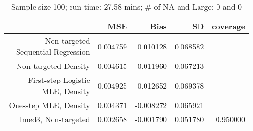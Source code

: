 \begin{table}[ht]
\centering
\caption{Sample size 100; run time: 27.58 mins; # of NA and Large:  0 and 0} 
\begin{tabular}{rrrrr}
  \hline
 & MSE & Bias & SD & coverage \\ 
  \hline
Non-targeted Sequential Regression & 0.004759 & -0.010128 & 0.068582 &  \\ 
  Non-targeted Density & 0.004615 & -0.011960 & 0.067213 &  \\ 
  First-step Logistic MLE, Density & 0.004925 & -0.012652 & 0.069378 &  \\ 
  One-step MLE, Density & 0.004371 & -0.008272 & 0.065921 &  \\ 
  lmed3, Non-targeted & 0.002658 & -0.001790 & 0.051780 & 0.950000 \\ 
   \hline
\end{tabular}
\end{table}

